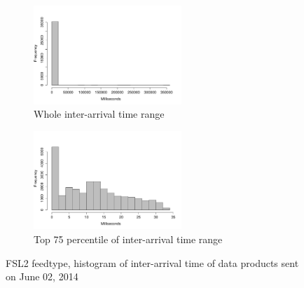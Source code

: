 \begin{figure}[htb!]
\centering
    \begin{subfigure}{0.5\linewidth}
        \centering
        \includegraphics[width=2.2in]{figures/Inter-hist-FSL20602.pdf}
        \caption{Whole inter-arrival time range }
        \label{FSL2_Inter_Whole}
    \end{subfigure}\hfill
    \begin{subfigure}{0.5\linewidth}
	\centering
    \includegraphics[width=2.2in]{figures/Inter-hist-FSL20602-TOP75.pdf}
        \caption{Top 75 percentile of inter-arrival time range  }
        \label{FSL2_Inter_75}
    \end{subfigure}\hfill
    \caption{FSL2 feedtype, histogram of inter-arrival time of data products sent on June 02, 2014}
    \label{FSL2_time}
\end{figure}


